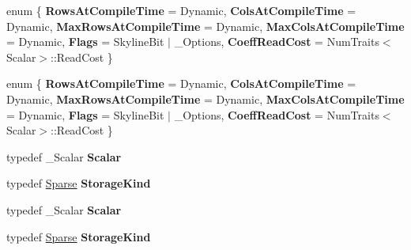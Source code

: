 \begin{DoxyCompactItemize}
\item 
\mbox{\label{struct_eigen_1_1internal_1_1traits_3_01_skyline_matrix_3_01___scalar_00_01___options_01_4_01_4_aa3c0c2c8509bd8fa715e6e211483770b}} 
enum \{ \newline
{\bfseries Rows\+At\+Compile\+Time} = Dynamic, 
{\bfseries Cols\+At\+Compile\+Time} = Dynamic, 
{\bfseries Max\+Rows\+At\+Compile\+Time} = Dynamic, 
{\bfseries Max\+Cols\+At\+Compile\+Time} = Dynamic, 
\newline
{\bfseries Flags} = Skyline\+Bit $\vert$ \+\_\+\+Options, 
{\bfseries Coeff\+Read\+Cost} = Num\+Traits$<$Scalar$>$\+:\+:Read\+Cost
 \}
\item 
\mbox{\label{struct_eigen_1_1internal_1_1traits_3_01_skyline_matrix_3_01___scalar_00_01___options_01_4_01_4_a13f1159d64a127825363e7a3d499e64b}} 
enum \{ \newline
{\bfseries Rows\+At\+Compile\+Time} = Dynamic, 
{\bfseries Cols\+At\+Compile\+Time} = Dynamic, 
{\bfseries Max\+Rows\+At\+Compile\+Time} = Dynamic, 
{\bfseries Max\+Cols\+At\+Compile\+Time} = Dynamic, 
\newline
{\bfseries Flags} = Skyline\+Bit $\vert$ \+\_\+\+Options, 
{\bfseries Coeff\+Read\+Cost} = Num\+Traits$<$Scalar$>$\+:\+:Read\+Cost
 \}
\item 
\mbox{\label{struct_eigen_1_1internal_1_1traits_3_01_skyline_matrix_3_01___scalar_00_01___options_01_4_01_4_ac6ee05861a70a54932d581c4cda72143}} 
typedef \+\_\+\+Scalar {\bfseries Scalar}
\item 
\mbox{\label{struct_eigen_1_1internal_1_1traits_3_01_skyline_matrix_3_01___scalar_00_01___options_01_4_01_4_ac563f67935e014e22ad4306b806c85b8}} 
typedef \hyperlink{struct_eigen_1_1_sparse}{Sparse} {\bfseries Storage\+Kind}
\item 
\mbox{\label{struct_eigen_1_1internal_1_1traits_3_01_skyline_matrix_3_01___scalar_00_01___options_01_4_01_4_ac6ee05861a70a54932d581c4cda72143}} 
typedef \+\_\+\+Scalar {\bfseries Scalar}
\item 
\mbox{\label{struct_eigen_1_1internal_1_1traits_3_01_skyline_matrix_3_01___scalar_00_01___options_01_4_01_4_ac563f67935e014e22ad4306b806c85b8}} 
typedef \hyperlink{struct_eigen_1_1_sparse}{Sparse} {\bfseries Storage\+Kind}
\end{DoxyCompactItemize}


